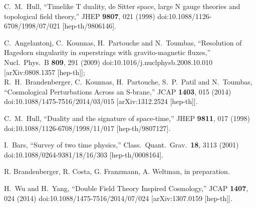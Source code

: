 \documentclass[prd, aps, superscriptaddress, preprintnumbers, twocolumn, floatfix, nofootinbib]{revtex4}
\begin{document}
\begin{thebibliography}{99}
C.~M.~Hull,
  ``Timelike T duality, de Sitter space, large N gauge theories and topological field theory,''
  JHEP {\bf 9807}, 021 (1998)
  doi:10.1088/1126-6708/1998/07/021
  [hep-th/9806146].

C.~Angelantonj, C.~Kounnas, H.~Partouche and N.~Toumbas,
  ``Resolution of Hagedorn singularity in superstrings with gravito-magnetic fluxes,''
  Nucl.\ Phys.\ B {\bf 809}, 291 (2009)
  doi:10.1016/j.nuclphysb.2008.10.010
  [arXiv:0808.1357 [hep-th]];\\
R.~H.~Brandenberger, C.~Kounnas, H.~Partouche, S.~P.~Patil and N.~Toumbas,
  ``Cosmological Perturbations Across an S-brane,''
  JCAP {\bf 1403}, 015 (2014)
  doi:10.1088/1475-7516/2014/03/015
  [arXiv:1312.2524 [hep-th]].

C.~M.~Hull,
  ``Duality and the signature of space-time,''
  JHEP {\bf 9811}, 017 (1998)
  doi:10.1088/1126-6708/1998/11/017
  [hep-th/9807127].

I.~Bars,
  ``Survey of two time physics,''
  Class.\ Quant.\ Grav.\  {\bf 18}, 3113 (2001)
  doi:10.1088/0264-9381/18/16/303
  [hep-th/0008164].

R. Brandenberger, R. Costa, G. Franzmann, A. Weltman, in preparation.

  H.~Wu and H.~Yang,
  ``Double Field Theory Inspired Cosmology,''
  JCAP {\bf 1407}, 024 (2014)
  doi:10.1088/1475-7516/2014/07/024
  [arXiv:1307.0159 [hep-th]].

\end{thebibliography}
\end{document}
